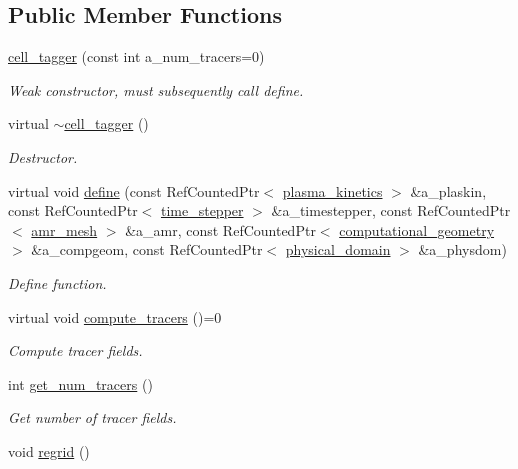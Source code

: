 \subsection*{Public Member Functions}
\begin{DoxyCompactItemize}
\item 
\hyperlink{classcell__tagger_a60e688c08bd9156e3f875a5df4243e4d}{cell\+\_\+tagger} (const int a\+\_\+num\+\_\+tracers=0)
\begin{DoxyCompactList}\small\item\em Weak constructor, must subsequently call define. \end{DoxyCompactList}\item 
virtual \hyperlink{classcell__tagger_a5c2b0d29e31c31ae982017ec48007dec}{$\sim$cell\+\_\+tagger} ()
\begin{DoxyCompactList}\small\item\em Destructor. \end{DoxyCompactList}\item 
virtual void \hyperlink{classcell__tagger_aba186789a22860d4dec3b92b261e99b7}{define} (const Ref\+Counted\+Ptr$<$ \hyperlink{classplasma__kinetics}{plasma\+\_\+kinetics} $>$ \&a\+\_\+plaskin, const Ref\+Counted\+Ptr$<$ \hyperlink{classtime__stepper}{time\+\_\+stepper} $>$ \&a\+\_\+timestepper, const Ref\+Counted\+Ptr$<$ \hyperlink{classamr__mesh}{amr\+\_\+mesh} $>$ \&a\+\_\+amr, const Ref\+Counted\+Ptr$<$ \hyperlink{classcomputational__geometry}{computational\+\_\+geometry} $>$ \&a\+\_\+compgeom, const Ref\+Counted\+Ptr$<$ \hyperlink{classphysical__domain}{physical\+\_\+domain} $>$ \&a\+\_\+physdom)
\begin{DoxyCompactList}\small\item\em Define function. \end{DoxyCompactList}\item 
virtual void \hyperlink{classcell__tagger_a29584dad2d4156e946859447dc9eac4c}{compute\+\_\+tracers} ()=0
\begin{DoxyCompactList}\small\item\em Compute tracer fields. \end{DoxyCompactList}\item 
int \hyperlink{classcell__tagger_ac2c735c0746c381c2bc56817b88c0a05}{get\+\_\+num\+\_\+tracers} ()
\begin{DoxyCompactList}\small\item\em Get number of tracer fields. \end{DoxyCompactList}\item 
void \hyperlink{classcell__tagger_a63d13b47b42107a44c4087bb1b1961b2}{regrid} ()

\end{DoxyCompactItemize}

